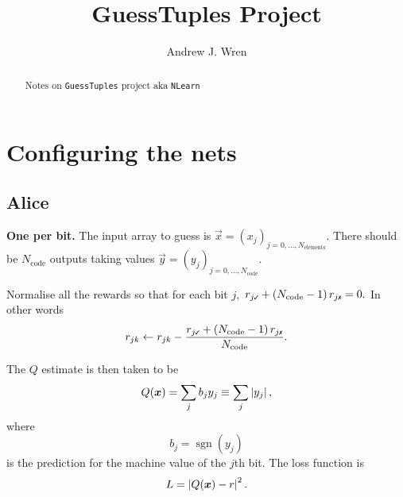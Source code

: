 \documentclass[12pt]{article}
\title{GuessTuples Project}
\author{Andrew J. Wren}
\begin{document}
\maketitle

\begin{abstract}
	Notes on \texttt{GuessTuples} project aka \texttt{NLearn}
\end{abstract}


\section{Configuring the nets}

\subsection{Alice}

{\bf One per bit.} The input array to guess is $\vec{x}=(x_j)_{j=0,...,N_\text{elements}}.$  There should be $N_\text{code}$ outputs taking values $\vec{y} = (y_j)_{j=0,...,N_\text{code}}.$

Normalise all the rewards so that for each bit $j,$ $\rt{j} + \left(N_\text{code} - 1\right)\rf{j} = 0.$  In other words
\begin{equation}
	r_{jk}
	\gets
	r_{jk} - \frac{ \rt{j} + \left(N_\text{code} - 1\right)\rf{j}}{N_\text{code}}
	.
\end{equation}

The $Q$ estimate is then taken to be
\begin{equation}
	Q(\boldsymbol{x})
	=
	\sum_j b_j y_j
	\equiv
	\sum_j \left\lvert y_j \right\rvert
	,		
\end{equation}
where
\begin{equation}
	b_j = \operatorname{sgn} (y_j)
\end{equation}
is the prediction for the machine value of the $j$th bit.  The loss function is
\begin{equation}
	L
	=
	\left\lvert Q(\boldsymbol{x}) -r \right\rvert^2
	. 
\end{equation}
\end{document}
